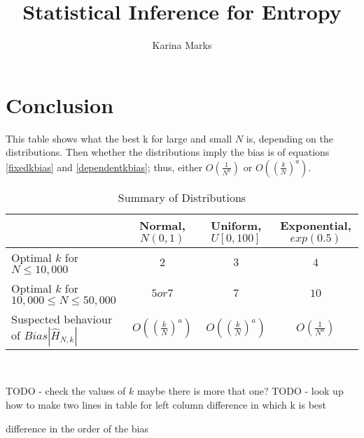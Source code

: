 \documentclass{report}
\title{Statistical Inference for Entropy}
\author{Karina Marks}
\begin{document}
\chapter{Conclusion}

This table shows what the best k for large and small $N$ is, depending on the distributions. Then whether the distributions imply the bias is of equations \ref{fixedkbias} and \ref{dependentkbias}; thus, either $O \left( \frac{1}{N^{a}} \right)$ or $O\left( \left( \frac{k}{N} \right)^{a} \right)$.

\begin{table}
\caption{Summary of Distributions} \label{distribution_comparison}
\begin{center}
\begin{tabular}{| l || c | c | c|} 
\toprule
 &  Normal, $N(0,1)$ & Uniform, $U[0,100]$ & Exponential, $exp(0.5)$ \\
\midrule[1pt]
Optimal $k$ for $N \leq 10,000$   & $2$ & $3$  &  $4$ \\
Optimal $k$ for $10,000 \leq N \leq 50,000$ &  $5 or 7 $ & $7$  & $10$ \\
Suspected behaviour of $Bias |\hat{H}_{N, k} |$ & $O\left( \left( \frac{k}{N} \right)^{a} \right)$ & $O\left( \left( \frac{k}{N} \right)^{a} \right)$ &  $O \left( \frac{1}{N^{a}} \right)$ \\
\hline
\end{tabular}
\\[10pt]
\end{center}
\end{table}

TODO - check the values of $k$ maybe there is more that one?
TODO - look up how to make two lines in table for left column
difference in which k is best

difference in the order of the bias
\end{document}
